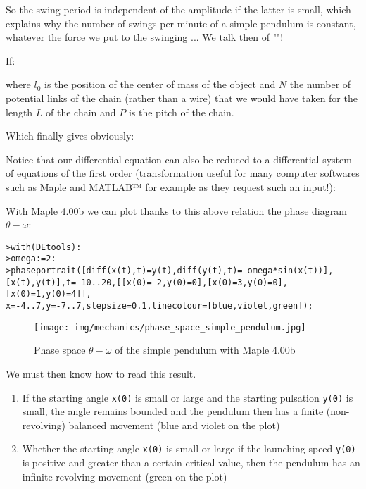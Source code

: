 	So the swing period is independent of the amplitude if the latter is small, which explains why the number of swings per minute of a simple pendulum is constant, whatever the force we put to the swinging ... We talk then of ""!
	
	If:
	
	where $l_0$ is the position of the center of mass of the object and $N$ the number of potential links of the chain (rather than a wire) that we would have taken for the length $L$ of the chain and $P$ is the pitch of the chain.

	Which finally gives obviously:
	
	Notice that our differential equation can also be reduced to a differential system of equations of the first order (transformation useful for many computer softwares such as Maple and MATLAB™ for example as they request such an input!):
	
	With Maple 4.00b we can plot thanks to this above relation the phase diagram $\theta-\omega$:

	\texttt{>with(DEtools):}\\
	\texttt{>omega:=2:}\\
	\texttt{>phaseportrait([diff(x(t),t)=y(t),diff(y(t),t)=-omega*sin(x(t))],}\\
	\texttt{[x(t),y(t)],t=-10..20,[[x(0)=-2,y(0)=0],[x(0)=3,y(0)=0],[x(0)=1,y(0)=4]],}\\
	\texttt{x=-4..7,y=-7..7,stepsize=0.1,linecolour=[blue,violet,green]);}
	
	\begin{figure}[H]
		\centering
		\texttt{[image: img/mechanics/phase\_space\_simple\_pendulum.jpg]}
		\caption{Phase space $\theta-\omega$ of the simple pendulum with Maple 4.00b}
	\end{figure}
	We must then know how to read this result.
	\begin{enumerate}
		\item If the starting angle \texttt{x(0)} is small or large and the starting pulsation \texttt{y(0)} is small, the angle remains bounded and the pendulum then has a finite (non-revolving) balanced movement (blue and violet on the plot)

		\item  Whether the starting angle \texttt{x(0)} is small or large if the launching speed \texttt{y(0)} is positive and greater than a certain critical value, then the pendulum has an infinite revolving movement (green on the plot)
	\end{enumerate}
	
